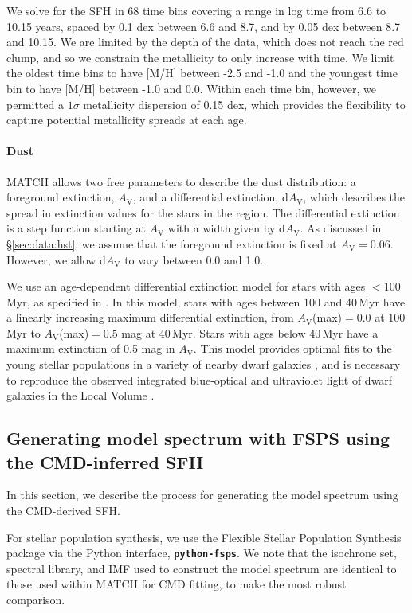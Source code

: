 \documentclass[preprint2]{aastex62}
\newcommand{\FSPS}{{\sc FSPS}\xspace}
\newcommand{\pFSPS}{{\tt \textbf{python-fsps}}\xspace}
\newcommand{\Myr}{$\,$Myr\xspace}
\newcommand{\Av}{\ensuremath{A_{\mathrm{V}}}\xspace}
\newcommand{\dAv}{\ensuremath{\mathrm{d}A_{\mathrm{V}}}\xspace}
\begin{document}
We solve for the SFH in 68 time bins covering a range in log time from 6.6 to 10.15 years, spaced by 0.1 dex between 6.6 and 8.7, and by 0.05 dex between 8.7 and 10.15. We are limited by the depth of the data, which does not reach the red clump, and so we constrain the metallicity to only increase with time. We limit the oldest time bins to have [M/H] between -2.5 and -1.0 and the youngest time bin to have [M/H] between -1.0 and 0.0. Within each time bin, however, we permitted a $1\sigma$ metallicity dispersion of 0.15 dex, which provides the flexibility to capture potential metallicity spreads at each age.

\paragraph{Dust}
MATCH allows two free parameters to describe the dust distribution: a foreground extinction, \Av, and a differential extinction, \dAv, which describes the spread in extinction values for the stars in the region. The differential extinction is a step function starting at \Av with a width given by \dAv. As discussed in \S\ref{sec:data:hst}, we assume that the foreground extinction is fixed at \Av$=0.06$. However, we allow \dAv to vary between 0.0 and 1.0.

We use an age-dependent differential extinction model for stars with ages $<100$\Myr, as specified in \citet{Dolphin+2003}. In this model, stars with ages between 100 and 40\Myr have a linearly increasing maximum differential extinction, from \Av(max)$= 0.0$ at 100\Myr to \Av(max)$= 0.5$ mag at 40\Myr. Stars with ages below $40$\Myr have a maximum extinction of 0.5 mag in \Av. This model provides optimal fits to the young stellar populations in a variety of nearby dwarf galaxies \citep[e.g.,][]{Dolphin+2003, Skillman+2003, Weisz+2011}, and is necessary to reproduce the observed integrated blue-optical and ultraviolet light of dwarf galaxies in the Local Volume \citep{Johnson+2013}.

\subsection{Generating model spectrum with FSPS using the CMD-inferred SFH}\label{sec:methods:fsps}

In this section, we describe the process for generating the model spectrum using the CMD-derived SFH. 

For stellar population synthesis, we use the Flexible Stellar Population Synthesis package \citep[\FSPS;][]{Conroy+2009, Conroy+2010} via the Python interface, \pFSPS \citep{pythonFSPSdfm}. We note that the isochrone set, spectral library, and IMF used to construct the model spectrum are identical to those used within MATCH for CMD fitting, to make the most robust comparison.
\end{document}
